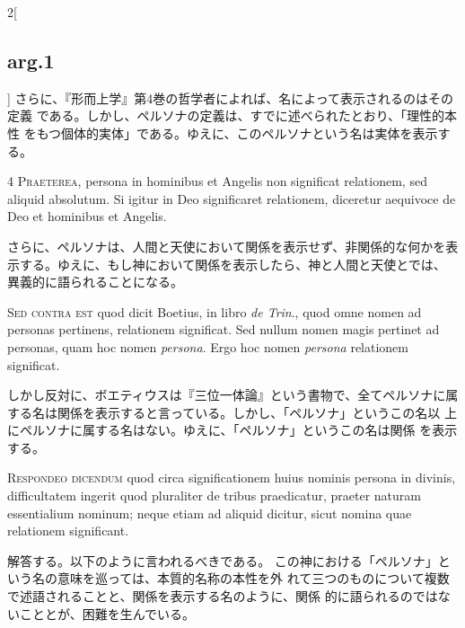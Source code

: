 \documentclass[paper=a4paper,fontsize=10pt,jafontsize=9pt,titlepage]{jlreq}
\begin{document}
\begin{paracol}{2}[\subsection{arg.1}]
さらに、『形而上学』第4巻の哲学者によれば、名によって表示されるのはその定義
 である。しかし、ペルソナの定義は、すでに述べられたとおり、「理性的本性
 をもつ個体的実体」である。ゆえに、このペルソナという名は実体を表示する。


4 {\scshape Praeterea}, persona in hominibus et Angelis non significat relationem,
sed aliquid absolutum. Si igitur in Deo significaret relationem,
diceretur aequivoce de Deo et hominibus et Angelis.

\switchcolumn

さらに、ペルソナは、人間と天使において関係を表示せず、非関係的な何かを表
 示する。ゆえに、もし神において関係を表示したら、神と人間と天使とでは、
 異義的に語られることになる。

\switchcolumn*[\subsection{s.c.}]

{\scshape Sed contra est} quod dicit Boetius, in libro {\itshape de Trin}., quod omne nomen ad
personas pertinens, relationem significat. Sed nullum nomen magis
pertinet ad personas, quam hoc nomen {\itshape persona}. Ergo hoc nomen {\itshape persona}
relationem significat.

\switchcolumn

しかし反対に、ボエティウスは『三位一体論』という書物で、全てペルソナに属
 する名は関係を表示すると言っている。しかし、「ペルソナ」というこの名以
 上にペルソナに属する名はない。ゆえに、「ペルソナ」というこの名は関係
 を表示する。


{\scshape Respondeo dicendum} quod circa significationem huius nominis persona in
divinis, difficultatem ingerit quod pluraliter de tribus praedicatur,
praeter naturam essentialium nominum; neque etiam ad aliquid dicitur,
sicut nomina quae relationem significant.

\switchcolumn

解答する。以下のように言われるべきである。
この神における「ペルソナ」という名の意味を巡っては、本質的名称の本性を外
れて三つのものについて複数で述語されることと、関係を表示する名のように、関係
的に語られるのではないこととが、困難を生んでいる。


\end{paracol}
\end{document}
